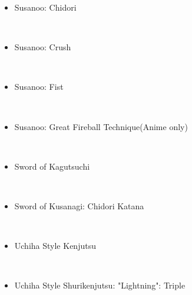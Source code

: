 \documentclass[a4paper,12pt]{article}
\begin{document}
\begin{itemize}
\item Susanoo: Chidori
\end{itemize}\\ \par \vspace{0.5cm}

\begin{itemize}
\item Susanoo: Crush
\end{itemize}\\ \par \vspace{0.5cm}

\begin{itemize}
\item Susanoo: Fist
\end{itemize}\\ \par \vspace{0.5cm}

\begin{itemize}
\item Susanoo: Great Fireball Technique(Anime only)
\end{itemize}\\ \par \vspace{0.5cm}

\begin{itemize}
\item Sword of Kagutsuchi
\end{itemize}\\ \par \vspace{0.5cm}

\begin{itemize}
\item Sword of Kusanagi: Chidori Katana
\end{itemize}\\ \par \vspace{0.5cm}

\begin{itemize}
\item Uchiha Style Kenjutsu
\end{itemize}\\ \par \vspace{0.5cm}

\begin{itemize}
\item Uchiha Style Shurikenjutsu: "Lightning": Triple
\end{itemize}\\ \par \vspace{0.5cm}
\end{document}
